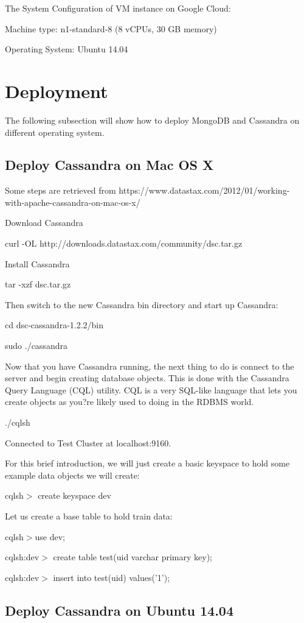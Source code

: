  The System Configuration of VM instance on Google Cloud:
 
 Machine type: n1-standard-8 (8 vCPUs, 30 GB memory)
 
 Operating System: Ubuntu 14.04

 \section{Deployment}
The following subsection will show how to deploy MongoDB and Cassandra
on different operating system.

\subsection{Deploy Cassandra on Mac OS X}

Some steps are retrieved from https://www.datastax.com/2012/01/working-
with-apache-cassandra-on-mac-os-x/

Download Cassandra

curl -OL http://downloads.datastax.com/community/dsc.tar.gz

Install Cassandra

tar -xzf dsc.tar.gz

Then switch to the new Cassandra bin directory and start up Cassandra:

cd dsc-cassandra-1.2.2/bin

sudo ./cassandra

Now that you have Cassandra running, the next thing to do is connect to the 
server and begin creating database objects. This is done with the Cassandra 
Query Language (CQL) utility. CQL is a very SQL-like language that lets you
 create objects as you?re likely used to doing in the RDBMS world.

./cqlsh

Connected to Test Cluster at localhost:9160.

For this brief introduction, we will just create a basic keyspace to hold some 
example data objects we will create:

cqlsh$>$ create keyspace dev

Let us create a base table to hold train data:

cqlsh$> $use dev;

cqlsh:dev$>$ create table test(uid varchar primary key); 

cqlsh:dev$>$ insert into test(uid) values('1');

\subsection{Deploy Cassandra on Ubuntu 14.04}

